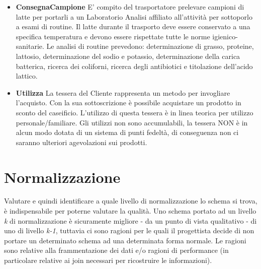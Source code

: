 \documentclass[12pt]{report}
\begin{document}
\begin{itemize}
\item \textbf{ConsegnaCampione} E' compito del trasportatore prelevare campioni di latte per portarli a un Laboratorio Analisi affiliato all'attività per sottoporlo a esami di routine.
Il latte durante il trasporto deve essere conservato a una specifica temperatura e devono essere rispettate tutte le norme igienico-sanitarie.
Le analisi di routine prevedono: determinazione di grasso, proteine, lattosio, determinazione del sodio e potassio, determinazione della carica batterica, ricerca dei coliforni, ricerca degli antibiotici e titolazione dell'acido lattico.


\item \textbf{Utilizza} La tessera del Cliente rappresenta un metodo per invogliare l'acquisto. Con la sua sottoscrizione è possibile acquistare un prodotto in sconto del caseificio. L'utilizzo di questa tessera è in linea teorica per utilizzo personale/familiare. Gli utilizzi non sono accumulabili, la tessera NON è in alcun modo dotata di un sistema di punti fedeltà, di conseguenza non ci saranno ulteriori agevolazioni sui prodotti.
\end{itemize}


\section{Normalizzazione}

Valutare e quindi identificare a quale livello di normalizzazione lo schema si trova, è indispensabile per poterne valutare la qualità. Uno schema portato ad un livello \textit{k} di normalizzazione è sicuramente migliore - da un punto di vista qualitativo - di uno di livello \textit{k-1}, tuttavia ci sono ragioni per le quali il progettista decide di non portare un determinato schema ad una determinata forma normale. Le ragioni sono relative alla frammentazione dei dati e/o ragioni di performance (in particolare relative ai join necessari per ricostruire le informazioni).
\end{document}
